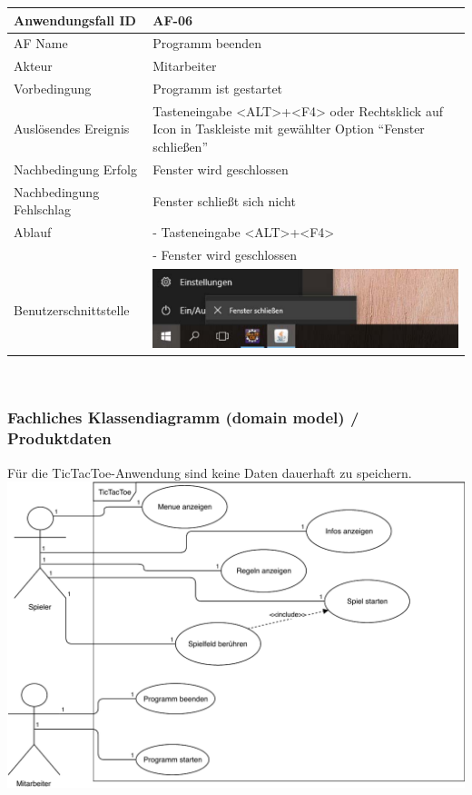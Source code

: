 \documentclass[12pt]{article}
\begin{document}
\begin{tabularx}{\textwidth}{|l|X|} \hline
Anwendungsfall ID&AF-06\\ \hline
AF Name&Programm beenden\\ \hline
Akteur&Mitarbeiter\\ \hline
Vorbedingung&Programm ist gestartet\\ \hline
Auslösendes Ereignis&Tasteneingabe <ALT>+<F4> oder Rechtsklick auf \Gls{Icon} in Taskleiste mit gewählter Option "`Fenster schließen"'\\ \hline
Nachbedingung Erfolg&Fenster wird geschlossen\\ \hline
Nachbedingung Fehlschlag&Fenster schließt sich nicht\\ \hline
Ablauf&- Tasteneingabe <ALT>+<F4>\\&- Fenster wird geschlossen\\ \hline
Benutzerschnittstelle&\includegraphics[scale=0.33]{Beenden.pdf}\\ \hline
\end{tabularx}\\

\newpage
\subsubsection{Fachliches Klassendiagramm (domain model) / Produktdaten}
Für die \Gls{TicTacToe}-Anwendung sind keine Daten dauerhaft zu speichern. \\
\includegraphics[scale=0.9]{Anwendungsfalldiagramm.pdf}\\
\end{document}
